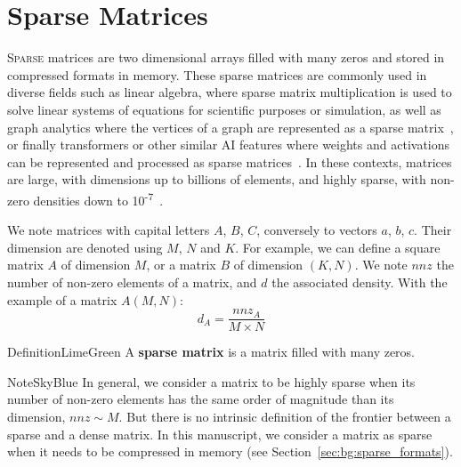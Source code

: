 
\section{Sparse Matrices}
\label{sec:bg:spMatrices}

\lettrine{S}{parse} matrices are two dimensional arrays filled with many zeros and stored in compressed formats in memory.
These sparse matrices are commonly used in diverse fields such as linear algebra, where sparse matrix multiplication is used to solve linear systems of equations for scientific purposes or simulation, as well as graph analytics where the vertices of a graph are represented as a sparse matrix~\cite{Buluc2011}, or finally transformers or other similar AI features where weights and activations can be represented and processed as sparse matrices~\cite{Gale2020, Farina2024}.
In these contexts, matrices are large, with dimensions up to billions of elements, and highly sparse, with non-zero densities down to 10\textsuperscript{-7}~\cite{Kolodziej2019_SuiteSparse}.

We note matrices with capital letters $A$, $B$, $C$, conversely to vectors $a$, $b$, $c$.
Their dimension are denoted using $M$, $N$ and $K$.
For example, we can define a square matrix $A$ of dimension $M$, or a matrix $B$ of dimension $(K, N)$.
We note $\mathit{nnz}$ the number of non-zero elements of a matrix, and $d$ the associated density.
With the example of a matrix $A(M, N)$: $$d_A = \frac{nnz_A}{M \times N}$$

\begin{highlight}{Definition}{LimeGreen}
    A \textbf{sparse matrix} is a matrix filled with many zeros.
\end{highlight}

\begin{highlight}{Note}{SkyBlue}
    In general, we consider a matrix to be highly sparse when its number of non-zero elements has the same order of magnitude than its dimension, $nnz \sim M$.
    But there is no intrinsic definition of the frontier between a sparse and a dense matrix.
    In this manuscript, we consider a matrix as sparse when it needs to be compressed in memory (see Section~\ref{sec:bg:sparse_formats}).
\end{highlight}

